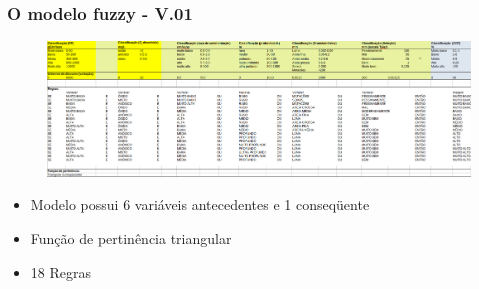 \documentclass[aspectratio=169]{beamer} %
\begin{document}
{{
\begin{frame}
\frametitle{O modelo fuzzy - V.01} 
\begin{figure}
\centering
\includegraphics[scale=0.2]{tabela_fuzzy.png}
\end{figure}
\pause
	\begin{itemize}
		\item Modelo possui 6 variáveis antecedentes e 1 conseqüente
		\pause
		\item Função de pertinência triangular
		\pause
		\item 18 Regras
	\end{itemize}
\end{frame} 
}


}
\end{document}
